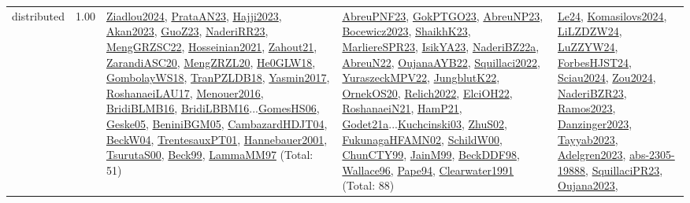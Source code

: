 {\begin{longtable}{p{3cm}r>{\raggedright\arraybackslash}p{6cm}>{\raggedright\arraybackslash}p{6cm}>{\raggedright\arraybackslash}p{8cm}}
\index{distributed}\index{Concepts!distributed}distributed &  1.00 & \hyperref[detail:Ziadlou2024]{Ziadlou2024}, \hyperref[detail:PrataAN23]{PrataAN23}, \hyperref[detail:Hajji2023]{Hajji2023}, \hyperref[detail:Akan2023]{Akan2023}, \hyperref[detail:GuoZ23]{GuoZ23}, \hyperref[detail:NaderiRR23]{NaderiRR23}, \hyperref[detail:MengGRZSC22]{MengGRZSC22}, \hyperref[detail:Hosseinian2021]{Hosseinian2021}, \hyperref[detail:Zahout21]{Zahout21}, \hyperref[detail:ZarandiASC20]{ZarandiASC20}, \hyperref[detail:MengZRZL20]{MengZRZL20}, \hyperref[detail:He0GLW18]{He0GLW18}, \hyperref[detail:GombolayWS18]{GombolayWS18}, \hyperref[detail:TranPZLDB18]{TranPZLDB18}, \hyperref[detail:Yasmin2017]{Yasmin2017}, \hyperref[detail:RoshanaeiLAU17]{RoshanaeiLAU17}, \hyperref[detail:Menouer2016]{Menouer2016}, \hyperref[detail:BridiBLMB16]{BridiBLMB16}, \hyperref[detail:BridiLBBM16]{BridiLBBM16}...\hyperref[detail:GomesHS06]{GomesHS06}, \hyperref[detail:Geske05]{Geske05}, \hyperref[detail:BeniniBGM05]{BeniniBGM05}, \hyperref[detail:CambazardHDJT04]{CambazardHDJT04}, \hyperref[detail:BeckW04]{BeckW04}, \hyperref[detail:TrentesauxPT01]{TrentesauxPT01}, \hyperref[detail:Hannebauer2001]{Hannebauer2001}, \hyperref[detail:TsurutaS00]{TsurutaS00}, \hyperref[detail:Beck99]{Beck99}, \hyperref[detail:LammaMM97]{LammaMM97} (Total: 51) & \hyperref[detail:AbreuPNF23]{AbreuPNF23}, \hyperref[detail:GokPTGO23]{GokPTGO23}, \hyperref[detail:AbreuNP23]{AbreuNP23}, \hyperref[detail:Bocewicz2023]{Bocewicz2023}, \hyperref[detail:ShaikhK23]{ShaikhK23}, \hyperref[detail:MarliereSPR23]{MarliereSPR23}, \hyperref[detail:IsikYA23]{IsikYA23}, \hyperref[detail:NaderiBZ22a]{NaderiBZ22a}, \hyperref[detail:AbreuN22]{AbreuN22}, \hyperref[detail:OujanaAYB22]{OujanaAYB22}, \hyperref[detail:Squillaci2022]{Squillaci2022}, \hyperref[detail:YuraszeckMPV22]{YuraszeckMPV22}, \hyperref[detail:JungblutK22]{JungblutK22}, \hyperref[detail:OrnekOS20]{OrnekOS20}, \hyperref[detail:Relich2022]{Relich2022}, \hyperref[detail:ElciOH22]{ElciOH22}, \hyperref[detail:RoshanaeiN21]{RoshanaeiN21}, \hyperref[detail:HamP21]{HamP21}, \hyperref[detail:Godet21a]{Godet21a}...\hyperref[detail:Kuchcinski03]{Kuchcinski03}, \hyperref[detail:ZhuS02]{ZhuS02}, \hyperref[detail:FukunagaHFAMN02]{FukunagaHFAMN02}, \hyperref[detail:SchildW00]{SchildW00}, \hyperref[detail:ChunCTY99]{ChunCTY99}, \hyperref[detail:JainM99]{JainM99}, \hyperref[detail:BeckDDF98]{BeckDDF98}, \hyperref[detail:Wallace96]{Wallace96}, \hyperref[detail:Pape94]{Pape94}, \hyperref[detail:Clearwater1991]{Clearwater1991} (Total: 88) & \hyperref[detail:Le24]{Le24}, \hyperref[detail:Komasilovs2024]{Komasilovs2024}, \hyperref[detail:LiLZDZW24]{LiLZDZW24}, \hyperref[detail:LuZZYW24]{LuZZYW24}, \hyperref[detail:ForbesHJST24]{ForbesHJST24}, \hyperref[detail:Sciau2024]{Sciau2024}, \hyperref[detail:Zou2024]{Zou2024}, \hyperref[detail:NaderiBZR23]{NaderiBZR23}, \hyperref[detail:Ramos2023]{Ramos2023}, \hyperref[detail:Danzinger2023]{Danzinger2023}, \hyperref[detail:Tayyab2023]{Tayyab2023}, \hyperref[detail:Adelgren2023]{Adelgren2023}, \hyperref[detail:abs-2305-19888]{abs-2305-19888}, \hyperref[detail:SquillaciPR23]{SquillaciPR23}, \hyperref[detail:Oujana2023]{Oujana2023}, 
\end{longtable}}

